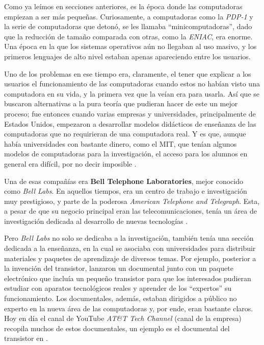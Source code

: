 \documentclass[letterpaper,12pt,oneside]{book}
\begin{document}
        Como ya leímos en secciones
		anteriores,
		es la época donde las computadoras empiezan a ser más pequeñas. Curiosamente, a computadoras como la \textit{PDP-1} y la serie de computadoras que detonó, se les llamaba
		``minicomputadoras'', dado que la reducción de tamaño comparada con otras, como la \textit{ENIAC}, era enorme. Una época en la que
		los sistemas operativos aún no llegaban al uso masivo, y los primeros lenguajes de alto nivel estaban apenas apareciendo entre los usuarios. 
  
        Uno de los 
		problemas en ese tiempo era, claramente, el tener que explicar
		a los usuarios el funcionamiento de las computadoras cuando estos no habían visto una computadora en su vida, y la primera vez que la veían era para usarla. Así que se buscaron alternativas a la pura teoría que pudieran hacer de este un mejor proceso; fue entonces cuando varias empresas 
		y universidades, principalmente de Estados Unidos, empezaron a desarrollar modelos didácticos de enseñanza de las computadoras que no requirieran de una computadora 
		real. Y es que, aunque había universidades con bastante dinero, como el MIT, que tenían algunos modelos de computadoras para la investigación, 
		el acceso para los alumnos en general era difícil, por no decir imposible \cite[p. 71]{ceruzzi_computing_2012}.
        
        Una de esas compañías era \textbf{Bell Telephone 
		Laboratories}, mejor conocido como \textit{Bell Labs}. En aquellos tiempos, era un centro de trabajo e investigación muy prestigioso, y parte de la
		poderosa \textit{American Telephone and Telegraph}. Esta, a pesar de que su negocio
		principal eran las telecomunicaciones, tenía un área de investigación dedicada al desarrollo de nuevas tecnologías \cite{isaacson_innovators_2014}.
  
        Pero \textit{Bell Labs} no solo se dedicaba a la investigación,
		también tenía una sección dedicada a la enseñanza, en la cual se asociaba con universidades para distribuir materiales y paquetes de aprendizaje de diversos
		temas. Por ejemplo, posterior a la invención del transistor, lanzaron un documental junto
		con un paquete electrónico que incluía un pequeño transistor para que los interesados pudieran estudiar con aparatos tecnológicos reales y aprender
		de los ``expertos'' su funcionamiento. Los documentales, además, estaban dirigidos a público no experto en la nueva área de las computadoras y, por ende,
		eran bastante claros. Hoy en día el canal de YouTube \textit{AT\&T Tech Channel} (canal de la empresa) recopila muchos de estos documentales, un ejemplo es el 
		documental del transistor en \cite{att_tech_channel_transistor_2015}.
		
\end{document}
